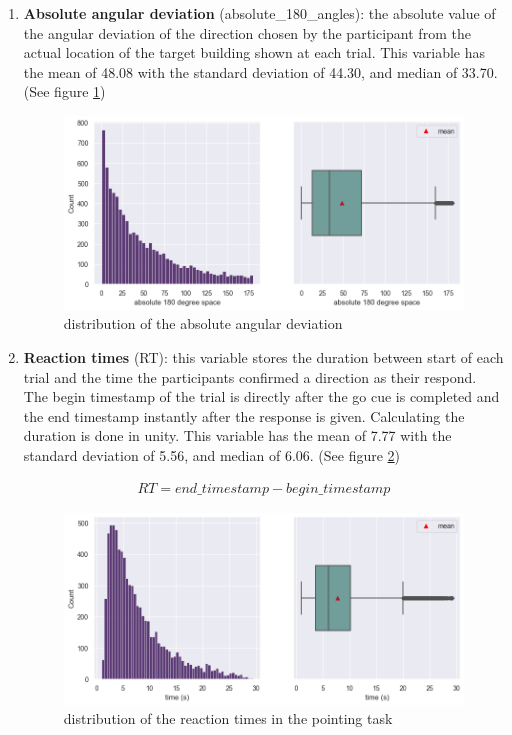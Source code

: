 \begin{enumerate}
	\item \textbf{Absolute angular deviation} {\emphasize (absolute\_180\_angles)}: the absolute value of the angular deviation of the direction chosen by the participant from the actual location of the target building shown at each trial. This variable has the mean of 48.08 with the standard deviation of 44.30, and median of 33.70. (See figure \ref{fig:angular_dev_dists})
	
	
	\begin{figure}[h]
		\centering
		\includegraphics[width=150mm]{figures/angular_deviation_hist_box_23.png}
		\caption[Distribution of the absolute angular deviation]{distribution of the absolute angular deviation}
		\label{fig:angular_dev_dists}
	\end{figure}

	\item \textbf{Reaction times} {\emphasize (RT)}: this variable stores the duration between start of each trial and the time the participants confirmed a direction as their respond. The begin timestamp of the trial is directly after the go cue is completed and the end timestamp instantly after the response is given. Calculating the duration is done in unity. This variable has the mean of 7.77 with the standard deviation of 5.56, and median of 6.06. (See figure \ref{fig:rt_dists})
	
	\begin{align*}
		RT = end\_timestamp - begin\_timestamp
	\end{align*}

	\begin{figure}[h]
	\centering
	\includegraphics[width=150mm]{figures/RT_hist_box_23.png}
	\caption[Distribution of reaction times]{distribution of the  reaction times in the pointing task}
	\label{fig:rt_dists}
\end{figure}

\end{enumerate}


